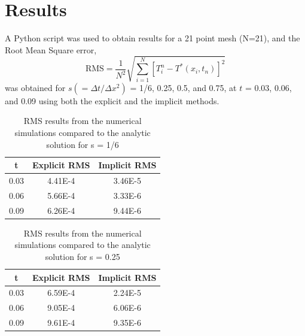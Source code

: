 \documentclass[twocolumn,10pt]{asme2ej}
\begin{document}



\section{Results}

A Python script was used to obtain results for a 21 point mesh (N=21), and the Root Mean Square error,
\begin{equation}
\mbox{RMS} = \frac{1}{N^2}\sqrt{\sum\limits_{i=1}^N[T_i^n - T^*(x_i, t_n)]^2}
\end{equation}
was obtained for $s(=\Delta t/ \Delta x^2)$ = 1/6, 0.25, 0.5, and 0.75, at $t$ = 0.03, 0.06, and 0.09 using both the explicit and the implicit methods.

\begin{table}[h]
\begin{center}
\label{table_ASME}
\begin{tabular}{|c | c c|}
\hline
t & Explicit RMS & Implicit RMS \\
\hline
0.03 & 4.41E-4 & 3.46E-5\\
0.06 & 5.66E-4 & 3.33E-6\\
0.09 & 6.26E-4 & 9.44E-6\\
\hline
\end{tabular}
\caption{RMS results from the numerical simulations compared to the analytic solution for s = 1/6}
\end{center}
\end{table}

\begin{table}[h]
\begin{center}
\label{table_ASME}
\begin{tabular}{|c | c c|}
\hline
t & Explicit RMS & Implicit RMS \\
\hline
0.03 & 6.59E-4 & 2.24E-5\\
0.06 & 9.05E-4 & 6.06E-6\\
0.09 & 9.61E-4 & 9.35E-6\\
\hline
\end{tabular}
\caption{RMS results from the numerical simulations compared to the analytic solution for s = 0.25}
\end{center}
\end{table}
\end{document}
